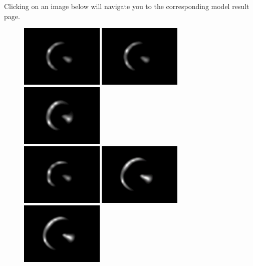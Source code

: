 \documentclass{article}
\begin{document}
{\small{}Clicking on an image below will navigate you to the corresponding model 
result page.}

\begin{figure}
\centering
\includegraphics[width=113pt]{fig/simsModeling-fig010.png}
\includegraphics[width=113pt]{fig/simsModeling-fig011.png}
\includegraphics[width=113pt]{fig/simsModeling-fig012.png} \\
\includegraphics[width=113pt]{fig/simsModeling-fig013.png}
\includegraphics[width=113pt]{fig/simsModeling-fig014.png}
\includegraphics[width=113pt]{fig/simsModeling-fig015.png} \\

\end{figure}
\end{document}
